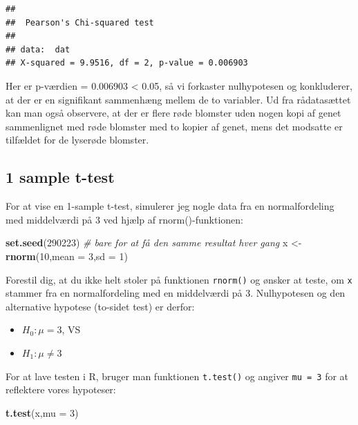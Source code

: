 \documentclass[
]{book}
\newenvironment{Shaded}{\begin{snugshade}}{\end{snugshade}}
\newcommand{\AttributeTok}[1]{\textcolor[rgb]{0.13,0.29,0.53}{#1}}
\newcommand{\CommentTok}[1]{\textcolor[rgb]{0.56,0.35,0.01}{\textit{#1}}}
\newcommand{\DecValTok}[1]{\textcolor[rgb]{0.00,0.00,0.81}{#1}}
\newcommand{\FunctionTok}[1]{\textcolor[rgb]{0.13,0.29,0.53}{\textbf{#1}}}
\newcommand{\NormalTok}[1]{#1}
\newcommand{\OtherTok}[1]{\textcolor[rgb]{0.56,0.35,0.01}{#1}}
\providecommand{\tightlist}{%
  \setlength{\itemsep}{0pt}\setlength{\parskip}{0pt}}
\theoremstyle{definition}
\theoremstyle{definition}
\theoremstyle{definition}
\theoremstyle{definition}
\theoremstyle{remark}
\begin{document}
\begin{verbatim}
## 
##  Pearson's Chi-squared test
## 
## data:  dat
## X-squared = 9.9516, df = 2, p-value = 0.006903
\end{verbatim}

Her er p-værdien = 0.006903 \textless{} 0.05, så vi forkaster nulhypotesen og konkluderer, at der er en signifikant sammenhæng mellem de to variabler. Ud fra rådatasættet kan man også observere, at der er flere røde blomster uden nogen kopi af genet sammenlignet med røde blomster med to kopier af genet, mens det modsatte er tilfældet for de lyserøde blomster.

\subsection{1 sample t-test}\label{sample-t-test}

For at vise en 1-sample t-test, simulerer jeg nogle data fra en normalfordeling med middelværdi på 3 ved hjælp af rnorm()-funktionen:

\begin{Shaded}
\begin{Highlighting}[]
\FunctionTok{set.seed}\NormalTok{(}\DecValTok{290223}\NormalTok{) }\CommentTok{\# bare for at få den samme resultat hver gang}
\NormalTok{x }\OtherTok{\textless{}{-}} \FunctionTok{rnorm}\NormalTok{(}\DecValTok{10}\NormalTok{,}\AttributeTok{mean =} \DecValTok{3}\NormalTok{,}\AttributeTok{sd =} \DecValTok{1}\NormalTok{)}
\end{Highlighting}
\end{Shaded}

Forestil dig, at du ikke helt stoler på funktionen \texttt{rnorm()} og ønsker at teste, om \texttt{x} stammer fra en normalfordeling med en middelværdi på 3. Nulhypotesen og den alternative hypotese (to-sidet test) er derfor:

\begin{itemize}
\tightlist
\item
  \(H_{0}: \mu = 3\), VS
\item
  \(H_{1}: \mu \neq 3\)
\end{itemize}

For at lave testen i R, bruger man funktionen \texttt{t.test()} og angiver \texttt{mu\ =\ 3} for at reflektere vores hypoteser:

\begin{Shaded}
\begin{Highlighting}[]
\FunctionTok{t.test}\NormalTok{(x,}\AttributeTok{mu =} \DecValTok{3}\NormalTok{)}
\end{Highlighting}
\end{Shaded}
\end{document}
